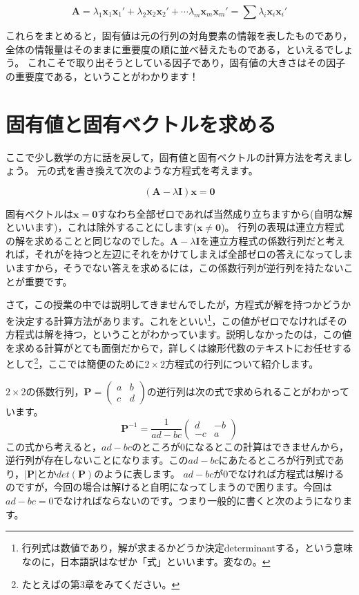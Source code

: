 \documentclass{ltjsbook}
\begin{document}
\[
    \bm{A}= \lambda_1 \bm{x}_1 \bm{x}_1' + \lambda_2 \bm{x}_2 \bm{x}_2' + \cdots \lambda_m \bm{x}_m \bm{x}_m'= \sum \lambda_{i} \bm{x}_{i} \bm{x}_i'
\]

これらをまとめると，固有値は元の行列の対角要素の情報を表したものであり，全体の情報量はそのままに重要度の順に並べ替えたものである，といえるでしょう。
これこそで取り出そうとしている因子であり，固有値の大きさはその因子の重要度である，ということがわかります！

\section{固有値と固有ベクトルを求める}
ここで少し数学の方に話を戻して，固有値と固有ベクトルの計算方法を考えましょう。
元の式を書き換えて次のような方程式を考えます。

\[ (\bm{A} - \lambda\bm{I})\bm{x} = \bm{0} \]

固有ベクトルは$\bm{x}=\bm{0}$すなわち全部ゼロであれば当然成り立ちますから(自明な解といいます)，これは除外することにします($\bm{x}\neq \bm{0}$)。
行列の表現は連立方程式の解を求めることと同じなのでした。$\bm{A} - \lambda\bm{I}$を連立方程式の係数行列だと考えれば，それがを持つと左辺にそれをかけてしまえば全部ゼロの答えになってしまいますから，そうでない答えを求めるには，この係数行列が逆行列を持たないことが重要です。

さて，この授業の中では説明してきませんでしたが，方程式が解を持つかどうかを決定する計算方法があります。これをといい\footnote{行列式は数値であり，解が求まるかどうか決定determinantする，という意味なのに，日本語訳はなぜか「式」といいます。変なの。}，この値がゼロでなければその方程式は解を持つ，ということがわかっています。説明しなかったのは，この値を求める計算がとても面倒だからで，詳しくは線形代数のテキストにお任せするとして\footnote{たとえば\citet{Murakami20160301}の第3章をみてください。}，ここでは簡便のために$2\times2$方程式の行列について紹介します。

$2 \times 2$の係数行列，$\bm{P}=\begin{pmatrix} a&b\\c&d \end{pmatrix}$の逆行列は次の式で求められることがわかっています。
\[ \bm{P}^{-1}= \frac{1}{ad-bc}\begin{pmatrix}d & -b \\ -c &a \end{pmatrix} \]
この式から考えると，$ad - bc$のところが0になるとこの計算はできませんから，逆行列が存在しないことになります。この$ad-bc$にあたるところが行列式であり，$|\bm{P}|$とか$det(\bm{P})$のように表します。
$ad-bc$が0でなければ方程式は解けるのですが，今回の場合は解けると自明になってしまうので困ります。今回は$ad-bc=0$でなければならないのです。つまり一般的に書くと次のようになります。
\end{document}
